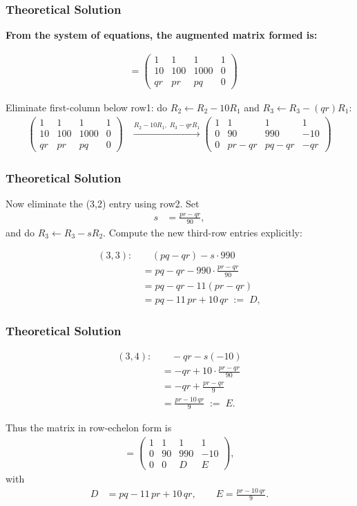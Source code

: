 \documentclass{beamer}
\theoremstyle{remark}
\newcommand{\myvec}[1]{\ensuremath{\begin{pmatrix}#1\end{pmatrix}}}
\let\vec\mathbf
\numberwithin{equation}{section}
\begin{document}
\begin{frame}
\frametitle{Theoretical Solution}


\noindent\textbf{From the system of equations, the augmented matrix formed is:}

\begin{align}
[\,\myvec{M}\mid \vec b\,]
&= \myvec{1 & 1 & 1 & 1 \\
10 & 100 & 1000 & 0 \\
qr & pr & pq & 0}
\end{align}

Eliminate first-column below row1: do \(R_2\leftarrow R_2-10R_1\) and \(R_3\leftarrow R_3-(qr)R_1\):
\begin{align}
\myvec{1 & 1 & 1 & 1 \\
10 & 100 & 1000 & 0 \\
qr & pr & pq & 0}
&\xrightarrow{R_2-10R_1,\;R_3-qrR_1}
\myvec{1 & 1 & 1 & 1 \\
0 & 90 & 990 & -10 \\
0 & pr-qr & pq-qr & -qr}
\end{align}

\end{frame}

\begin{frame}
\frametitle{Theoretical Solution}
Now eliminate the (3,2) entry using row2. Set
\begin{align}
s &= \frac{pr-qr}{90},
\end{align}
and do \(R_3\leftarrow R_3 - sR_2\). Compute the new third-row entries explicitly:

\begin{align}
(3,3)\text{: }&\quad (pq-qr) - s\cdot 990
\\
&= pq-qr - 990\cdot\frac{pr-qr}{90}
\\
&= pq-qr - 11(pr-qr)
\\
&= pq - 11\,pr + 10\,qr \;:=\; D,
\end{align}

\end{frame}

\begin{frame}
\frametitle{Theoretical Solution}
\begin{align}
(3,4)\text{: }&\quad -qr - s(-10)
\\
&= -qr + 10\cdot\frac{pr-qr}{90}
\\
&= -qr + \frac{pr-qr}{9}
\\
&= \frac{pr - 10\,qr}{9} \;:=\; E.
\end{align}

Thus the matrix in row-echelon form is
\begin{align}
[\,\myvec{M}\mid \vec b\,] =
\myvec{1 & 1 & 1 & 1 \\
0 & 90 & 990 & -10 \\
0 & 0 & D & E},
\end{align}
with
\begin{align}
D &= pq - 11\,pr + 10\,qr, \qquad E = \frac{pr - 10\,qr}{9}.
\end{align}

\end{frame}
\end{document}

